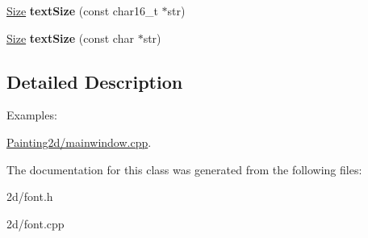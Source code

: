 \begin{DoxyCompactItemize}
\item 
\hypertarget{class_tempest_1_1_font_a07ce8d1efa336475332069babce6df2f}{\hyperlink{struct_tempest_1_1_size}{Size} {\bfseries text\+Size} (const char16\+\_\+t $\ast$str)}\label{class_tempest_1_1_font_a07ce8d1efa336475332069babce6df2f}

\item 
\hypertarget{class_tempest_1_1_font_aa29edd6a150c5862797313b76a26a5f5}{\hyperlink{struct_tempest_1_1_size}{Size} {\bfseries text\+Size} (const char $\ast$str)}\label{class_tempest_1_1_font_aa29edd6a150c5862797313b76a26a5f5}

\end{DoxyCompactItemize}


\subsection{Detailed Description}
\begin{Desc}
\item[Examples\+: ]\par
\hyperlink{_painting2d_2mainwindow_8cpp-example}{Painting2d/mainwindow.\+cpp}.\end{Desc}


The documentation for this class was generated from the following files\+:\begin{DoxyCompactItemize}
\item 
2d/font.\+h\item 
2d/font.\+cpp\end{DoxyCompactItemize}
